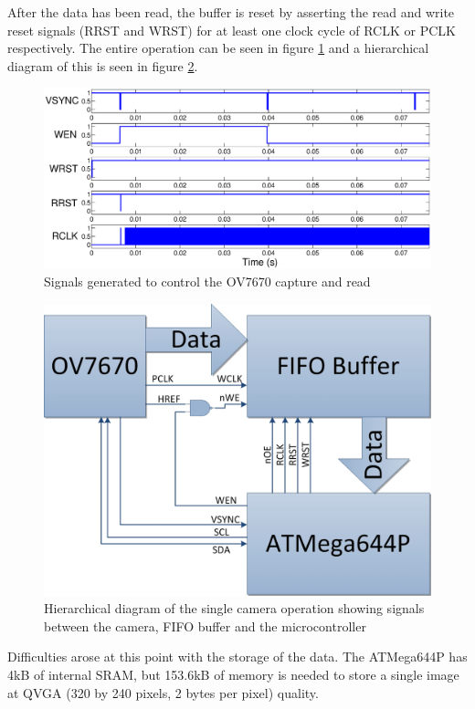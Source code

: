 After the data has been read, the buffer is reset by asserting the read and write reset signals (RRST and WRST) for at least one clock cycle of RCLK or PCLK respectively. The entire operation can be seen in figure \ref{fig:ov_Capture} and a hierarchical diagram of this is seen in figure \ref{fig:cam:heir}.
\begin{figure}
\includegraphics[width = \textwidth]{./Figures/ov7670_im_capture.eps}
\caption{Signals generated to control the OV7670 capture and read}
\label{fig:ov_Capture}
\end{figure}
\begin{figure}
\includegraphics[width=\textwidth]{./Figures/Camera_Hierarchy.jpg}
\caption{Hierarchical diagram of the single camera operation showing signals between the camera, FIFO buffer and the microcontroller}
\label{fig:cam:heir}
\end{figure}

Difficulties arose at this point with the storage of the data. The ATMega644P has 4kB of internal SRAM, but  153.6kB of memory is needed to store a single image at QVGA (320 by 240 pixels, 2 bytes per pixel) quality. 

